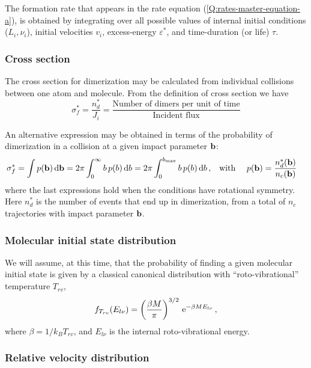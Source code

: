 The formation rate that appears in the rate equation (\ref{Q:rates-master-equation-a}), is obtained by integrating over all possible values of internal initial conditions ($L_{i},\nu_{i}$), initial velocities $v_{i}$, excess-energy $\varepsilon^{*}$, and time-duration (or life) $\tau$.
\subsubsection{Cross section}
\label{S:cross-section}

The cross section for dimerization may be calculated from individual collisions between one atom and molecule. 
From the definition of cross section we have
\begin{equation*}
  \sigma_{f}^{*} = \frac{n_{d}^{*}}{J_{i}}= \frac{\text{Number of dimers per unit of time}}{\text{Incident flux}}
\end{equation*}

An alternative expression may be obtained in terms of the probability of dimerization in a collision at a given impact parameter $\mathbf{b}$:
\begin{align}
  \label{Q:rates-def-probab}
  \sigma_{f}^{*} = \int p(\mathbf{b})\,\mathrm{d} \mathbf{b} = 2 \pi \int_{0}^{\infty} b \, p(b) \,\mathrm{d} b = 2 \pi \int_{0}^{b_{\text{max}}} b \, p(b) \,\mathrm{d} b\,, & \quad \text{with } \quad  p(\mathbf{b}) = \frac{n_{d}^{*}(\mathbf{b})}{n_{c}(\mathbf{b})}
\end{align}
where the last expressions hold when the conditions have rotational symmetry. Here $n_{d}^{*}$ is the number of events that end up in dimerization, from a total of $n_{c}$ trajectories with impact parameter $\mathbf{b}$.

\subsubsection{Molecular initial state distribution}

We will assume, at this time, that the probability of finding a given molecular initial state is given by a classical canonical distribution with ``roto-vibrational'' temperature $T_{rv}$,
\begin{equation}
  \label{Q:rates-rotovib-distrib}
  f_{T_{rv}}(E_{l\nu}) = \left( \frac{\beta M}{\pi} \right)^{3/2} \, \mathrm{e}^{- \beta M E_{l\nu}} \,,
\end{equation}
where $\beta= 1/k_{B}T_{rv}$, and $E_{l\nu}$ is the internal roto-vibrational energy.

\subsubsection{Relative velocity distribution}

